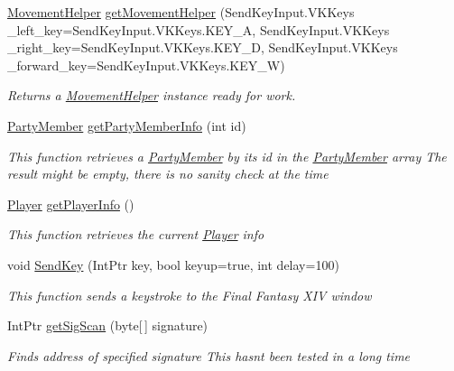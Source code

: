 \begin{DoxyCompactItemize}
\hyperlink{classffxivlib_1_1_movement_helper}{Movement\-Helper} \hyperlink{classffxivlib_1_1_f_f_x_i_v_l_i_b_a1032d39df92490bb83d6c40361accd77}{get\-Movement\-Helper} (Send\-Key\-Input.\-V\-K\-Keys \-\_\-left\-\_\-key=Send\-Key\-Input.\-V\-K\-Keys.\-K\-E\-Y\-\_\-\-A, Send\-Key\-Input.\-V\-K\-Keys \-\_\-right\-\_\-key=Send\-Key\-Input.\-V\-K\-Keys.\-K\-E\-Y\-\_\-\-D, Send\-Key\-Input.\-V\-K\-Keys \-\_\-forward\-\_\-key=Send\-Key\-Input.\-V\-K\-Keys.\-K\-E\-Y\-\_\-\-W)
\begin{DoxyCompactList}\small\item\em Returns a \hyperlink{classffxivlib_1_1_movement_helper}{Movement\-Helper} instance ready for work. \end{DoxyCompactList}\item 
\hyperlink{classffxivlib_1_1_party_member}{Party\-Member} \hyperlink{classffxivlib_1_1_f_f_x_i_v_l_i_b_a8cd7985eb9beb13c092ae1ed5f21c9f8}{get\-Party\-Member\-Info} (int id)
\begin{DoxyCompactList}\small\item\em This function retrieves a \hyperlink{classffxivlib_1_1_party_member}{Party\-Member} by its id in the \hyperlink{classffxivlib_1_1_party_member}{Party\-Member} array The result might be empty, there is no sanity check at the time \end{DoxyCompactList}\item 
\hyperlink{classffxivlib_1_1_player}{Player} \hyperlink{classffxivlib_1_1_f_f_x_i_v_l_i_b_aaf42ae8d84f170a0f18207369fb8e1a9}{get\-Player\-Info} ()
\begin{DoxyCompactList}\small\item\em This function retrieves the current \hyperlink{classffxivlib_1_1_player}{Player} info \end{DoxyCompactList}\item 
void \hyperlink{classffxivlib_1_1_f_f_x_i_v_l_i_b_ac4d88c5b015e78af8455be0bef6f3aca}{Send\-Key} (Int\-Ptr key, bool keyup=true, int delay=100)
\begin{DoxyCompactList}\small\item\em This function sends a keystroke to the Final Fantasy X\-I\-V window \end{DoxyCompactList}\item 
Int\-Ptr \hyperlink{classffxivlib_1_1_f_f_x_i_v_l_i_b_a532f7bcc0371915d2bbd74e6fdaf47ae}{get\-Sig\-Scan} (byte\mbox{[}$\,$\mbox{]} signature)
\begin{DoxyCompactList}\small\item\em Finds address of specified signature This hasnt been tested in a long time \end{DoxyCompactList}\item 

\end{DoxyCompactItemize}
